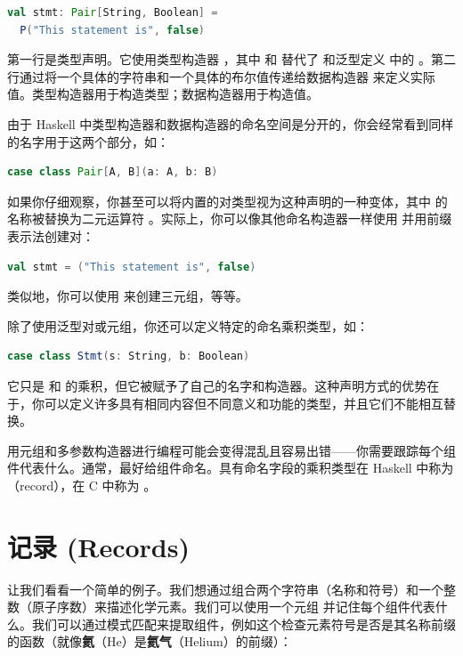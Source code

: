 \begin{lstlisting}[language=Scala]
val stmt: Pair[String, Boolean] =
  P("This statement is", false)
\end{lstlisting}
第一行是类型声明。它使用类型构造器 ，其中  和  替代了  和泛型定义  中的 。第二行通过将一个具体的字符串和一个具体的布尔值传递给数据构造器  来定义实际值。类型构造器用于构造类型；数据构造器用于构造值。

由于 Haskell 中类型构造器和数据构造器的命名空间是分开的，你会经常看到同样的名字用于这两个部分，如：

\begin{lstlisting}[language=Scala]
case class Pair[A, B](a: A, b: B)
\end{lstlisting}
如果你仔细观察，你甚至可以将内置的对类型视为这种声明的一种变体，其中  的名称被替换为二元运算符 \code{(,)}。实际上，你可以像其他命名构造器一样使用 \code{(,)} 并用前缀表示法创建对：

\begin{lstlisting}[language=Scala]
val stmt = ("This statement is", false)
\end{lstlisting}
类似地，你可以使用 \code{(,,)} 来创建三元组，等等。

除了使用泛型对或元组，你还可以定义特定的命名乘积类型，如：

\begin{lstlisting}[language=Scala]
case class Stmt(s: String, b: Boolean)
\end{lstlisting}
它只是  和  的乘积，但它被赋予了自己的名字和构造器。这种声明方式的优势在于，你可以定义许多具有相同内容但不同意义和功能的类型，并且它们不能相互替换。

用元组和多参数构造器进行编程可能会变得混乱且容易出错——你需要跟踪每个组件代表什么。通常，最好给组件命名。具有命名字段的乘积类型在 Haskell 中称为（record），在 C 中称为 。

\section{记录 (Records)}

让我们看看一个简单的例子。我们想通过组合两个字符串（名称和符号）和一个整数（原子序数）来描述化学元素。我们可以使用一个元组  并记住每个组件代表什么。我们可以通过模式匹配来提取组件，例如这个检查元素符号是否是其名称前缀的函数（就像\textbf{氦}（He）是\textbf{氦气}（Helium）的前缀）：

